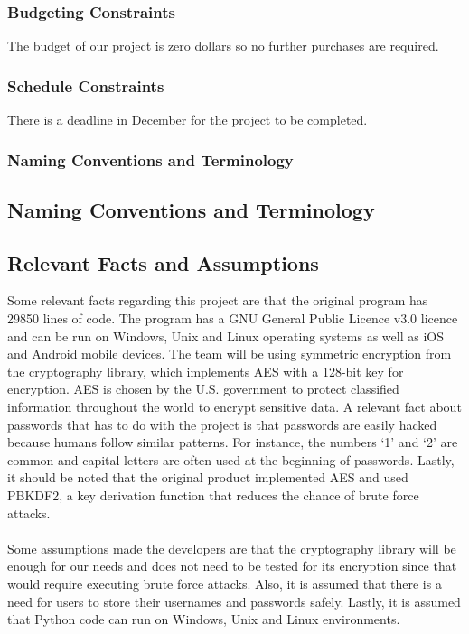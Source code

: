 \documentclass[12pt, titlepage]{article}
\begin{document}
\subsubsection{Budgeting Constraints}

The budget of our project is zero dollars so no further purchases are required.

\subsubsection{Schedule Constraints}

There is a deadline in December for the project to be completed.

\subsubsection{Naming Conventions and Terminology}

\subsection{Naming Conventions and Terminology}

\subsection{Relevant Facts and Assumptions}

Some relevant facts regarding this project are that the original program has 29850 lines of code. 
The program has a GNU General Public Licence v3.0 licence and can be run on Windows, Unix and Linux 
operating systems as well as iOS and Android mobile devices. The team will be using symmetric encryption
 from the cryptography library, which implements AES with a 128-bit key for encryption. AES is chosen by the 
U.S. government to protect classified information throughout the world to encrypt sensitive data. A relevant 
fact about passwords that has to do with the project is that passwords are easily hacked because humans 
follow similar patterns. For instance, the numbers ‘1’ and ‘2’ are common and capital letters are often used at
 the beginning of passwords. Lastly, it should be noted that the original product implemented AES and used 
PBKDF2, a key derivation function that reduces the chance of brute force attacks.
\\
\\
Some assumptions made the developers are that the cryptography library will be enough for our needs and does
 not need to be tested for its encryption since that would require executing brute force attacks. Also, it is 
assumed that there is a need for users to store their usernames and passwords safely. Lastly, it is assumed 
that Python code can run on Windows, Unix and Linux environments. 
\end{document}
